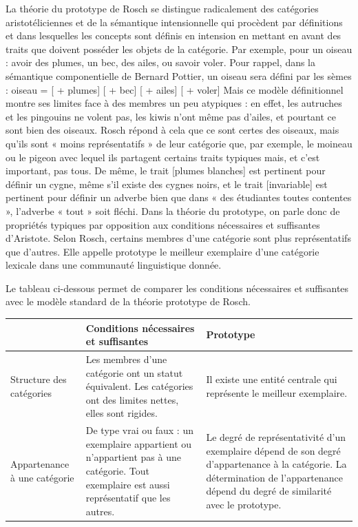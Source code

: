 La théorie du prototype de Rosch se distingue radicalement des catégories aristotéliciennes et de la sémantique intensionnelle qui procèdent par définitions et dans lesquelles les concepts sont définis en intension en mettant en avant des traits que doivent posséder les objets de la catégorie. Par exemple, pour un oiseau : avoir des plumes, un bec, des ailes, ou savoir voler. Pour rappel, dans la sémantique componentielle de Bernard Pottier, un oiseau sera défini par les sèmes : oiseau = [ + plumes] [ + bec] [ + ailes] [ + voler] Mais ce modèle définitionnel montre ses limites face à des membres un peu atypiques : en effet, les autruches et les pingouins ne volent pas, les kiwis n’ont même pas d’ailes, et pourtant ce sont bien des oiseaux. Rosch répond à cela que ce sont certes des oiseaux, mais qu’ils sont « moins représentatifs » de leur catégorie que, par exemple, le moineau ou le pigeon avec lequel ils partagent certains traits typiques mais, et c’est important, pas tous. De même, le trait [plumes blanches] est pertinent pour définir un cygne, même s’il existe des cygnes noirs, et le trait [invariable] est pertinent pour définir un adverbe bien que dans « des étudiantes toutes contentes », l’adverbe « tout » soit fléchi. Dans la théorie du prototype, on parle donc de propriétés typiques par opposition aux conditions nécessaires et suffisantes d’Aristote. Selon Rosch, certains membres d’une catégorie sont plus représentatifs que d’autres. Elle appelle prototype le meilleur exemplaire d’une catégorie lexicale dans une communauté linguistique donnée.\par


Le tableau ci-dessous permet de comparer les conditions nécessaires et suffisantes avec le modèle standard de la théorie prototype de Rosch.

{\small\renewcommand{\arraystretch}{1.12}\setlength{\tabcolsep}{5pt}
\begin{longtable}{@{}>{\raggedright\arraybackslash}p{.17\linewidth}>{\raggedright\arraybackslash}p{.39\linewidth}>{\raggedright\arraybackslash}p{.37\linewidth}@{}}
\toprule
 & Conditions nécessaires et suffisantes & Prototype\\
\midrule
Structure des catégories & Les membres d’une catégorie ont un statut équivalent. Les catégories ont des limites nettes, elles sont rigides. & Il existe une entité centrale qui représente le meilleur exemplaire.\\
\addlinespace
Appartenance à une catégorie & De type vrai ou faux : un exemplaire appartient ou n’appartient pas à une catégorie. Tout exemplaire est aussi représentatif que les autres. & Le degré de représentativité d’un exemplaire dépend de son degré d’appartenance à la catégorie. La détermination de l’appartenance dépend du degré de similarité avec le prototype.\\
\bottomrule
\end{longtable}}

